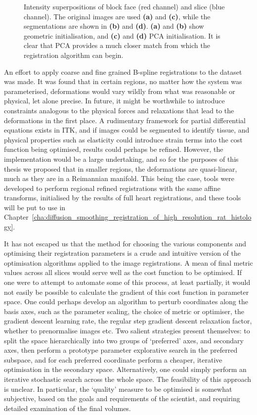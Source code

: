 \begin{figure}[htbp]
    \caption{Intensity superpositions of block face (red channel) and slice (blue channel). The original images are used \textbf{(a)} and \textbf{(c)}, while the segmentations are shown in \textbf{(b)} and \textbf{(d)}. \textbf{(a)} and \textbf{(b)} show geometric initialisation, and \textbf{(c)} and \textbf{(d)} PCA initialisation. It is clear that PCA provides a much closer match from which the registration algorithm can begin.}
    \label{fig:582_pca}
  \end{figure}
  
	An effort to apply coarse and fine grained B-spline registrations to the dataset was made. It was found that in certain regions, no matter how the system was parameterised, deformations would vary wildly from what was reasonable or physical, let alone precise. In future, it might be worthwhile to introduce constraints analogous to the physical forces and relaxations that lead to the deformations in the first place. A rudimentary framework for partial differential equations exists in ITK, and if images could be segmented to identify tissue, and physical properties such as elasticity could introduce strain terms into the cost function being optimised, results could perhaps be refined. However, the implementation would be a large undertaking, and so for the purposes of this thesis we proposed that in smaller regions, the deformations are quasi-linear, much as they are in a Reimannian manifold. This being the case, tools were developed to perform regional refined registrations with the same affine transforms, initialised by the results of full heart registrations, and these tools will be put to use in Chapter~\ref{cha:diffusion_smoothing_registration_of_high_resolution_rat_histology}.
    
  It has not escaped us that the method for choosing the various components and optimising their registration parameters is a crude and intuitive version of the optimisation algorithms applied to the image registrations. A mean of final metric values across all slices would serve well as the cost function to be optimised. If one were to attempt to automate some of this process, at least partially, it would not easily be possible to calculate the gradient of this cost function in parameter space. One could perhaps develop an algorithm to perturb coordinates along the basis axes, such as the parameter scaling, the choice of metric or optimiser, the gradient descent learning rate, the regular step gradient descent relaxation factor, whether to prenormalise images etc. Two salient strategies present themselves: to split the space hierarchically into two groups of `preferred' axes, and secondary axes, then perform a prototype parameter explorative search in the preferred subspace, and for each preferred coordinate perform a cheaper, iterative optimisation in the secondary space. Alternatively, one could simply perform an iterative stochastic search across the whole space. The feasibility of this approach is unclear. In particular, the `quality' measure to be optimised is somewhat subjective, based on the goals and requirements of the scientist, and requiring detailed examination of the final volumes.
  
